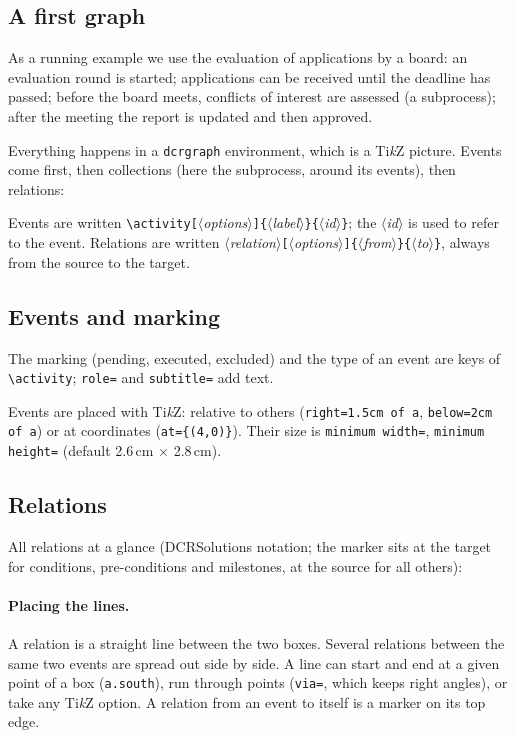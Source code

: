 \documentclass[a4paper,11pt]{article}
\newcommand\example[1]{%
  \begin{tcolorbox}[colback=white, colframe=black!25, boxrule=0.4pt,
      arc=1mm, left=2mm, right=2mm, halign lower=center]
    
    \tcblower
    
  \end{tcolorbox}}
\newcommand\cs[1]{\texttt{\textbackslash#1}}
\newcommand\key[1]{\texttt{#1}}
\newcommand\meta[1]{\ensuremath{\langle}\textit{#1}\ensuremath{\rangle}}
\newcommand\marg[1]{\texttt{\{}\meta{#1}\texttt{\}}}
\newcommand\oarg[1]{\texttt{[}\meta{#1}\texttt{]}}
\begin{document}
\subsection{A first graph}
As a running example we use the evaluation of applications by a board:
an evaluation round is started; applications can be received until the
deadline has passed; before the board meets, conflicts of interest are
assessed (a subprocess); after the meeting the report is updated and then
approved.

Everything happens in a \texttt{dcrgraph} environment, which is a
Ti\emph{k}Z picture. Events come first, then collections (here the
subprocess, around its events), then relations:
\example{opening}
Events are written \cs{activity}\oarg{options}\marg{label}\marg{id}; the
\meta{id} is used to refer to the event. Relations are written
\meta{relation}\oarg{options}\marg{from}\marg{to}, always from the source
to the target.

\subsection{Events and marking}
The marking (pending, executed, excluded) and the type of an event are
keys of \cs{activity}; \key{role=} and \key{subtitle=} add text.
\example{events}
Events are placed with Ti\emph{k}Z: relative to others
(\key{right=1.5cm of a}, \key{below=2cm of a}) or at coordinates
(\key{at=\{(4,0)\}}). Their size is \key{minimum width=}, \key{minimum height=}
(default 2.6\,cm $\times$ 2.8\,cm).

\subsection{Relations}
All relations at a glance (DCRSolutions notation; the marker sits at the target
for conditions, pre-conditions and milestones, at the source for all
others):
\example{relations-all}

\paragraph{Placing the lines.}\mbox{}\par
A relation is a straight line between the two boxes. Several relations
between the same two events are spread out side by side. A line can start
and end at a given point of a box (\key{a.south}), run through points
(\key{via=}, which keeps right angles), or take any Ti\emph{k}Z option.
A relation from an event to itself is a marker on its top edge.
\example{routing}
\end{document}
